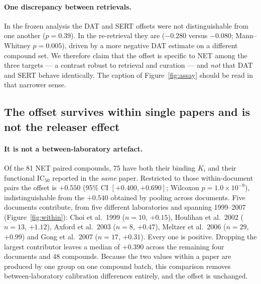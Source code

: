 \documentclass[11pt,a4paper]{article}
\begin{document}
\paragraph{One discrepancy between retrievals.} In the frozen analysis the DAT and
SERT offsets were not distinguishable from one another ($p=0.39$). In the
re-retrieval they are ($-0.280$ versus $-0.080$; Mann--Whitney $p=0.005$), driven by
a more negative DAT estimate on a different compound set. We therefore claim that the
offset is specific to NET among the three targets --- a contrast robust to retrieval
and curation --- and \emph{not} that DAT and SERT behave identically. The caption of
Figure~\ref{fig:assay} should be read in that narrower sense.

\subsection{The offset survives within single papers and is not the releaser effect}
\label{sec:within-doc}
\label{sec:confounds-results}

\paragraph{It is not a between-laboratory artefact.} Of the 81 NET paired compounds,
75 have both their binding $K_i$ and their functional IC$_{50}$ reported in the
\emph{same} paper. Restricted to those within-document pairs the offset is
$+0.550$ (95\% CI $[+0.400,+0.690]$; Wilcoxon $p=1.0\times10^{-9}$), indistinguishable
from the $+0.540$ obtained by pooling across documents. Five documents contribute, from
five different laboratories and spanning 1999--2007
(Figure~\ref{fig:within}): Choi et al.\ 1999 \cite{Choi1999} ($n=10$, $+0.15$),
Houlihan et al.\ 2002 \cite{Houlihan2002} ($n=13$, $+1.12$), Axford et
al.\ 2003 \cite{Axford2003} ($n=8$, $+0.47$), Meltzer et al.\ 2006 \cite{Meltzer2006}
($n=29$, $+0.99$) and Gong et al.\ 2007 \cite{Gong2007} ($n=17$, $+0.31$). Every one is
positive. Dropping the largest contributor leaves a median of $+0.390$ across the
remaining four documents and 48 compounds. Because the two values within a paper are produced by one group on one
compound batch, this comparison removes between-laboratory calibration differences
entirely, and the offset is unchanged.
\end{document}
